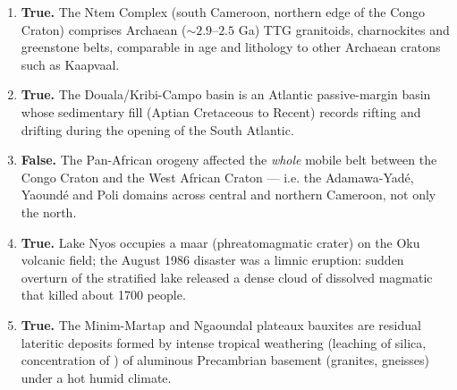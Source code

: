 \documentclass[11pt]{article}
\begin{document}
\begin{corrige}
\begin{enumerate}
\item \textbf{True.} The Ntem Complex (south Cameroon, northern edge of the Congo Craton) comprises Archaean ($\sim 2.9$–$2.5$ Ga) TTG granitoids, charnockites and greenstone belts, comparable in age and lithology to other Archaean cratons such as Kaapvaal.
\item \textbf{True.} The Douala/Kribi-Campo basin is an Atlantic passive-margin basin whose sedimentary fill (Aptian Cretaceous to Recent) records rifting and drifting during the opening of the South Atlantic.
\item \textbf{False.} The Pan-African orogeny affected the \emph{whole} mobile belt between the Congo Craton and the West African Craton — i.e. the Adamawa-Yadé, Yaoundé and Poli domains across central and northern Cameroon, not only the north.
\item \textbf{True.} Lake Nyos occupies a maar (phreatomagmatic crater) on the Oku volcanic field; the August 1986 disaster was a limnic eruption: sudden overturn of the stratified lake released a dense cloud of dissolved magmatic  that killed about 1700 people.
\item \textbf{True.} The Minim-Martap and Ngaoundal plateaux bauxites are residual lateritic deposits formed by intense tropical weathering (leaching of silica, concentration of ) of aluminous Precambrian basement (granites, gneisses) under a hot humid climate.
\end{enumerate}
\end{corrige}
\end{document}
